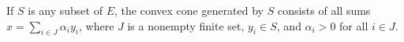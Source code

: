 If $S$ is any subset of $E$, the convex cone generated by $S$ consists of all sums $x = \sum_{i \in J} \alpha_i y_i$, where $J$ is a nonempty finite set, $y_i \in S$, and $\alpha_i > 0$ for all $i \in J$.